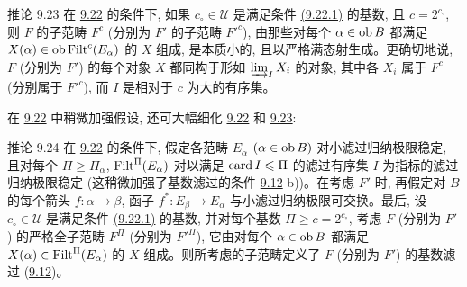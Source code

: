 
\begin{enonce*}{推论 9.23}
在 \hyperref[I.them9.22]{9.22} 的条件下, 如果 $c_\circ\in 𝒰$ 是满足条件 \hyperlink{sga4.exp.I.equation.9.22.1}{(9.22.1)} 的基数, 且 $c=2^{c_\circ}$, 则 $F$ 的子范畴 $F^c$ (分别为 $F'$ 的子范畴 ${F'}^c$), 由那些对每个 $\alpha\in\operatorname{ob} B$ 都满足 $X(\alpha)\in\operatorname{ob}\operatorname{Filt}^c(E_\alpha)$ 的 $X$ 组成, 是本质小的, 且以严格满态射生成。更确切地说, $F$ (分别为 $F'$) 的每个对象 $X$ 都同构于形如 $\varinjlim_I X_i$ 的对象, 其中各 $X_i$ 属于 $F^c$ (分别属于 ${F'}^c$), 而 $I$ 是相对于 $c$ 为大的有序集。
\end{enonce*}

在 \hyperref[I.them9.22]{9.22} 中稍微加强假设, 还可大幅细化 \hyperref[I.them9.22]{9.22} 和 \hyperref[I.cor9.23]{9.23}:

\begin{enonce*}{推论 9.24}
在 \hyperref[I.them9.22]{9.22} 的条件下, 假定各范畴 $E_\alpha$ $(\alpha\in\operatorname{ob} B)$ 对小滤过归纳极限稳定, 且对每个 $\Pi\geq\Pi_\alpha$, $\operatorname{Filt}^{\Pi}(E_\alpha)$ 对以满足 $\operatorname{card} I\leqslant\Pi$ 的滤过有序集 $I$ 为指标的滤过归纳极限稳定 (这稍微加强了基数\pageoriginale 滤过的条件 \hyperref[I.def9.12]{9.12} {\rm b)})。在考虑 $F'$ 时, 再假定对 $B$ 的每个箭头 $f:\alpha\rightarrow\beta$, 函子 $f^\ast:E_\beta\rightarrow E_\alpha$ 与小滤过归纳极限可交换。最后, 设 $c_\circ\in 𝒰$ 是满足条件 \hyperlink{sga4.exp.I.equation.9.22.1}{(9.22.1)} 的基数, 并对每个基数 $\Pi\geq c=2^{c_\circ}$, 考虑 $F$ (分别为 $F'$) 的严格全子范畴 $F^{\Pi}$ (分别为 ${F'}^{\Pi}$), 它由对每个 $\alpha\in\operatorname{ob} B$ 都满足 $X(\alpha)\in\operatorname{Filt}^{\Pi}(E_\alpha)$ 的 $X$ 组成。则所考虑的子范畴定义了 $F$ (分别为 $F'$) 的基数滤过 (\hyperref[I.def9.12]{9.12})。
\end{enonce*}

